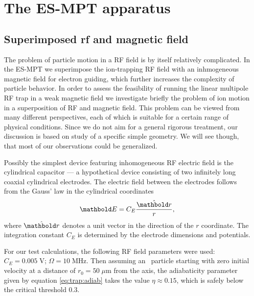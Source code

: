 
\chapter{The ES-MPT apparatus}

\label{ch:ESMPT}

\section{Superimposed rf and magnetic field}
The problem of particle motion in a \ac{RF} field is by itself
relatively complicated. In the \ac{ES-MPT} we superimpose
the ion-trapping \ac{RF} field with an inhmogeneous magnetic
field for electron guiding, which further increases the complexity
of particle behavior. In order to assess the feasibility of
running the linear multipole \ac{RF} trap in a weak magnetic field
we investigate briefly the problem of ion motion in a superposition
of \ac{RF} and magnetic field. This problem can be viewed from
many different perspectives, each of which is suitable for
a certain range of physical conditions. Since we do not aim for a
general rigorous treatment, our discussion is based on study
of a specific simple geometry. We will see though, that most
of our observations could be generalized.

Possibly the simplest device featuring inhomogeneous RF electric
field is the cylindrical capacitor --- a hypothetical device
consisting of two infinitely long coaxial cylindrical electrodes.
The electric field between the electrodes follows from the Gauss' law
in the cylindrical coordinates
\begin{equation}
\mb E = C_E\frac{\hat {\mb r}}{r},
\end{equation}
where $\hat{\mb r}$ denotes a unit vector in the direction of the $r$
coordinate. The integration constant $C_E$ is determined by the
electrode dimensions and potentials.

For our test calculations, the following \ac{RF} field
parameters were used:
$C_E = 0.005\;\text{V}$; $\Omega=10\;\text{MHz}$.
Then assuming an \Hminus\ particle starting with zero
initial velocity at a distance of $r_0=50\;\mu\text{m}$ from the
axis, the adiabaticity parameter given by equation
\eqref{eq:trap:adiab} takes the value $\eta\approx 0.15$, which
is safely below the critical threshold $0.3$.
